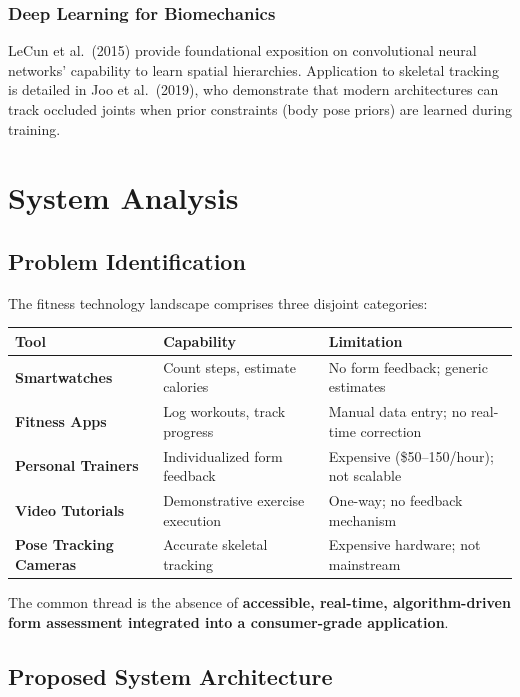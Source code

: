 \documentclass[12pt,a4paper]{article}
\begin{document}
\subsubsection*{Deep Learning for Biomechanics}

LeCun et al.\ (2015) provide foundational exposition on convolutional neural 
networks' capability to learn spatial hierarchies. Application to skeletal 
tracking is detailed in Joo et al.\ (2019), who demonstrate that modern 
architectures can track occluded joints when prior constraints (body pose 
priors) are learned during training.

\section{System Analysis}

\subsection{Problem Identification}

The fitness technology landscape comprises three disjoint categories:

\begin{longtable}{>{\bfseries}p{3.2cm} p{4.8cm} p{4.8cm}}
\toprule
\textbf{Tool} & \textbf{Capability} & \textbf{Limitation} \\
\midrule
\endhead
Smartwatches & Count steps, estimate calories & No form feedback; generic estimates \\[4pt]
Fitness Apps & Log workouts, track progress & Manual data entry; no real-time correction \\[4pt]
Personal Trainers & Individualized form feedback & Expensive (\$50--150/hour); not scalable \\[4pt]
Video Tutorials & Demonstrative exercise execution & One-way; no feedback mechanism \\[4pt]
Pose Tracking Cameras & Accurate skeletal tracking & Expensive hardware; not mainstream \\
\bottomrule
\end{longtable}

The common thread is the absence of \textbf{accessible, real-time, 
algorithm-driven form assessment integrated into a consumer-grade application}.

\subsection{Proposed System Architecture}
\end{document}
